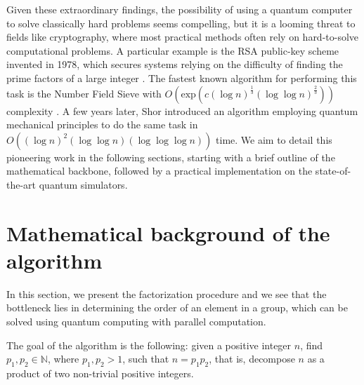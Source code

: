\documentclass[aps,prl,twocolumn,superscriptaddress,groupedaddress]{revtex4}  %
\begin{document}
Given these extraordinary findings, the possibility of using a quantum computer to solve classically hard problems seems compelling, but it is a looming threat to fields like cryptography, where most practical methods often rely on hard-to-solve computational problems. 
A particular example is the RSA public-key scheme invented in 1978, which secures systems relying on the difficulty of finding the prime factors of a large integer \cite{RSA178}.
The fastest known algorithm for performing this task is the Number Field Sieve with $O(\text{exp}(c(\log n)^\frac{1}{3}(\log\log n)^{\frac{2}{3}}))$ complexity \cite{LenstraLenstraManassePollard90}.
A few years later, Shor \cite{Shor_1994} introduced an algorithm employing quantum mechanical principles to do the same task in $O((\log n)^2(\log\log n)(\log \log \log n))$ time. We aim to detail this pioneering work in the following sections, starting with a brief outline of the mathematical backbone, followed by a practical implementation on the state-of-the-art quantum simulators. 


\section{\label{sec:MathematicalBackground}Mathematical background of the algorithm}

In this section, we present the factorization procedure and we see that the bottleneck lies in determining the order of an element in a group, which can be solved using quantum computing with parallel computation.

The goal of the algorithm is the following: given a positive integer $n$, find $p_1, p_2 \in \mathbb{N}$, where $p_1,p_2>1$, such that $n = p_1p_2$, that is, decompose $n$ as a product of two non-trivial positive integers.
\end{document}
